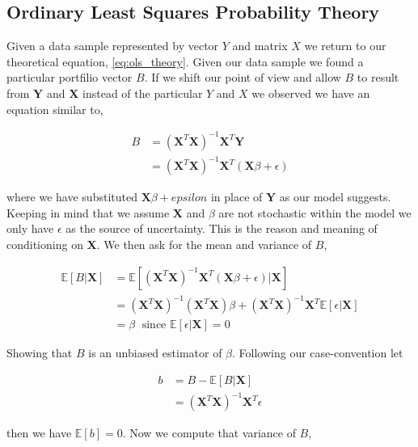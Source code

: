 \subsection{Ordinary Least Squares Probability Theory}

Given a data sample represented by vector $Y$ and matrix $X$ we return to our theoretical equation, \ref{eq:ols_theory}. Given our data sample we found a particular portfilio vector $B$. If we shift our point of view and allow $B$ to result from $\mathbf{Y}$ and $\mathbf{X}$ instead of the particular $Y$ and $X$ we observed we have an equation similar to,

\begin{align}
\label{eq:ols_B_random} B &= (\mathbf{X}^T\mathbf{X})^{-1}\mathbf{X}^T \mathbf{Y}\\
&= (\mathbf{X}^T\mathbf{X})^{-1}\mathbf{X}^T (\mathbf{X}\beta + \epsilon)
\end{align}

where we have substituted $\mathbf{X}\beta + epsilon$ in place of $\mathbf{Y}$ as our model suggests. Keeping in mind that we assume $\mathbf{X}$ and $\beta$ are not stochastic within the model we only have $\epsilon$ as the source of uncertainty. This is the reason and meaning of conditioning on $\mathbf{X}$. We then ask for the mean and variance of $B$,

\begin{align*}
\mathbb{E}[B | \mathbf{X}]
 &= \mathbb{E}[(\mathbf{X}^T\mathbf{X})^{-1}\mathbf{X}^T(\mathbf{X}\beta +\epsilon)| \mathbf{X}]\\
 &= (\mathbf{X}^T\mathbf{X})^{-1}(\mathbf{X}^T\mathbf{X})\beta + 
    (\mathbf{X}^T\mathbf{X})^{-1}\mathbf{X}^T\mathbb{E}[\epsilon | \mathbf{X}]\\
 &= \beta \; \text{ since } \mathbb{E}[\epsilon | \mathbf{X}] = 0
\end{align*}

Showing that $B$ is an unbiased estimator of $\beta$. Following our case-convention let

\begin{align*}
b &= B - \mathbb{E}[B | \mathbf{X}]\\
  &= (\mathbf{X}^T\mathbf{X})^{-1}\mathbf{X}^T\epsilon
\end{align*}

then we have $\mathbb{E}[b] = 0$. Now we compute that variance of $B$,

